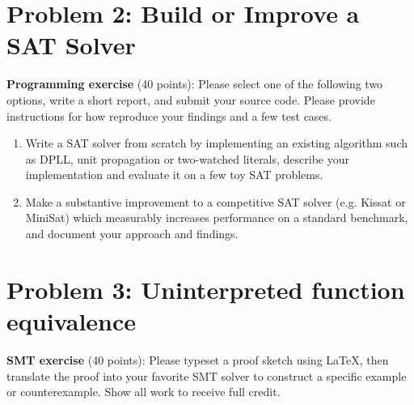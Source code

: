 \documentclass[11pt]{article}
\begin{document}
    \pagebreak


    \section{Problem 2: Build or Improve a SAT Solver}

    \noindent \textbf{Programming exercise} (40 points): Please select one of the following two options, write a short report, and submit your source code. Please provide instructions for how reproduce your findings and a few test cases.

    \begin{enumerate}
        \item Write a SAT solver from scratch by implementing an existing algorithm such as DPLL, unit propagation or two-watched literals, describe your implementation and evaluate it on a few toy SAT problems.
        \item Make a substantive improvement to a competitive SAT solver (e.g. Kissat or MiniSat) which measurably increases performance on a standard benchmark, and document your approach and findings.
    \end{enumerate}

    \section {Problem 3: Uninterpreted function equivalence}

    \noindent \textbf{SMT exercise} (40 points): Please typeset a proof sketch using \LaTeX, then translate the proof into your favorite SMT solver to construct a specific example or counterexample. Show all work to receive full credit.
\end{document}
